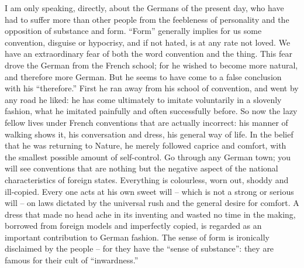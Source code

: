 I am only speaking, directly, about the Germans of the present day,
who have had to suffer more than other people from the feebleness of
personality and the opposition of substance and form. \enquote{Form}
generally implies for us some convention, disguise or hypocrisy, and
if not hated, is at any rate not loved. We have an extraordinary fear
of both the word convention and the thing. This fear drove the German
from the French school; for he wished to become more natural, and
therefore more German. But he seems to have come to a false
conclusion with his \enquote{therefore.} First he ran away from his school of
convention, and went by any road he liked: he has come ultimately to
imitate voluntarily in a slovenly fashion, what he imitated painfully
and often successfully before. So now the lazy fellow lives under
French conventions that are actually incorrect: his manner of walking
shows it, his conversation and dress, his general way of life. In the
belief that he was returning to Nature, he merely followed caprice
and comfort, with the smallest possible amount of self-control. Go
through any German town; you will see conventions that are nothing
but the negative aspect of the national characteristics of foreign
states. Everything is colourless, worn out, shoddy and ill-copied.
Every one acts at his own sweet will -- which is not a strong or
serious will -- on laws dictated by the universal rush and the general
desire for comfort. A dress that made no head ache in its inventing
and wasted no time in the making, borrowed from foreign models and
imperfectly copied, is regarded as an important contribution to
German fashion. The sense of form is ironically disclaimed by the
people -- for they have the \enquote{sense of substance}: they are famous for
their cult of \enquote{inwardness.}

